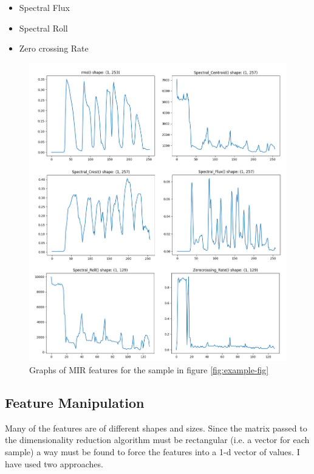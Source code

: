 \documentclass[11pt]{article}
\begin{document}
\begin{itemize}
\item Spectral Flux
\end{itemize}

\begin{itemize}
\item Spectral Roll
\end{itemize}

\begin{itemize}
\item Zero crossing Rate
\end{itemize}

\begin{figure}[H]
\centering
\includegraphics[width=.7\linewidth]{./Figures/mir_features.png}
\caption{Graphs of MIR features for the sample in figure \ref{fig:example-fig}}
\end{figure}

\subsection{Feature Manipulation}
\label{sec:org694b75f}

Many of the features are of different shapes and sizes. Since the matrix passed to the dimensionality reduction algorithm must be rectangular (i.e. a vector for each sample) a way must be found to force the features into a 1-d vector of values. I have used two approaches.
\end{document}

